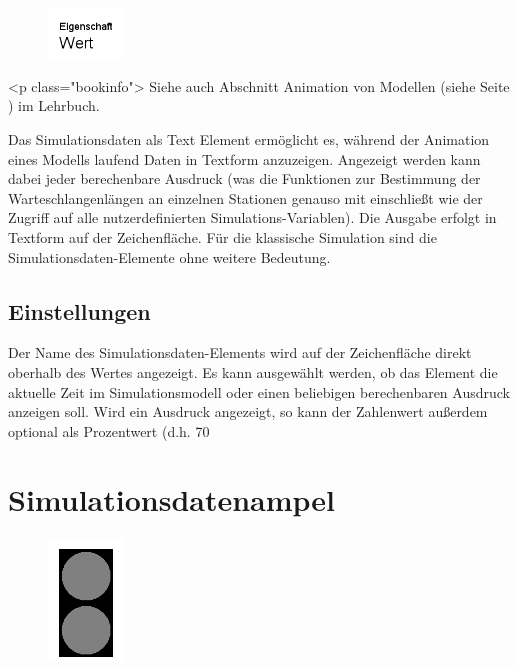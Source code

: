 \begin{figure}
\vspace{-22pt}
\includegraphics[width=2cm]{imageModelElementAnimationText.png}
\vspace{-22pt}
\end{figure}

<p class="bookinfo">
Siehe auch Abschnitt Animation von Modellen (siehe Seite \pageref{ref:book:5.4.3}) im Lehrbuch.

Das Simulationsdaten als Text Element ermöglicht es, während der Animation eines Modells laufend Daten in Textform anzuzeigen.
Angezeigt werden kann dabei jeder berechenbare Ausdruck (was die Funktionen zur Bestimmung der Warteschlangenlängen
an einzelnen Stationen genauso mit einschließt wie der Zugriff auf alle nutzerdefinierten Simulations-Variablen).
Die Ausgabe erfolgt in Textform auf der Zeichenfläche. Für die klassische Simulation sind die Simulationsdaten-Elemente
ohne weitere Bedeutung.

\subsection*{Einstellungen}

Der Name des Simulationsdaten-Elements wird auf der Zeichenfläche direkt oberhalb des Wertes angezeigt.
Es kann ausgewählt werden, ob das Element die aktuelle Zeit im Simulationsmodell oder einen beliebigen
berechenbaren Ausdruck anzeigen soll. Wird ein Ausdruck angezeigt, so kann der Zahlenwert außerdem optional
als Prozentwert (d.h. 70%


\section{Simulationsdatenampel}
\label{ref:ModelElementAnimationTrafficLights}

\begin{figure}
\vspace{-22pt}
\includegraphics[width=2cm]{imageModelElementAnimationTrafficLights.png}
\vspace{-22pt}
\end{figure}

